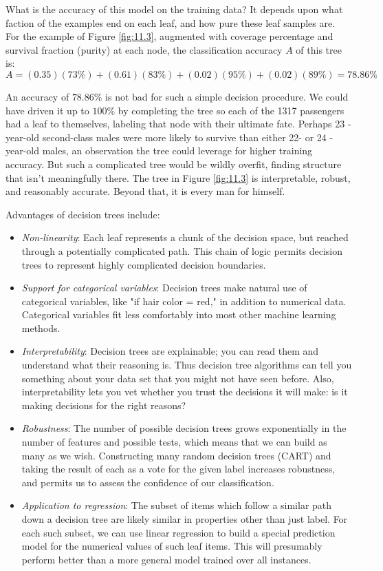\documentclass[10pt]{article}
\begin{document}
\begin{enumerate}
What is the accuracy of this model on the training data? It depends upon what faction of the examples end on each leaf, and how pure these leaf samples are. For the example of Figure \ref{fig:11.3}, augmented with coverage percentage and survival fraction (purity) at each node, the classification accuracy $A$ of this tree is:
\[
A = (0.35)(73\%) + (0.61)(83\%) + (0.02)(95\%) + (0.02)(89\%) = 78.86\%
\]

An accuracy of $78.86\%$ is not bad for such a simple decision procedure. We could have driven it up to $100\%$ by completing the tree so each of the 1317 passengers had a leaf to themselves, labeling that node with their ultimate fate. Perhaps 23 -year-old second-class males were more likely to survive than either 22- or 24 -year-old males, an observation the tree could leverage for higher training accuracy. But such a complicated tree would be wildly overfit, finding structure that isn't meaningfully there. The tree in Figure \ref{fig:11.3} is interpretable, robust, and reasonably accurate. Beyond that, it is every man for himself.

Advantages of decision trees include:

\begin{itemize}
  \item \textit{Non-linearity}: Each leaf represents a chunk of the decision space, but reached through a potentially complicated path. This chain of logic permits decision trees to represent highly complicated decision boundaries.
  \item \textit{Support for categorical variables}: Decision trees make natural use of categorical variables, like "if hair color = red," in addition to numerical data. Categorical variables fit less comfortably into most other machine learning methods.
  \item \textit{Interpretability}: Decision trees are explainable; you can read them and understand what their reasoning is. Thus decision tree algorithms can tell you something about your data set that you might not have seen before. Also, interpretability lets you vet whether you trust the decisions it will make: is it making decisions for the right reasons?
  \item \textit{Robustness}: The number of possible decision trees grows exponentially in the number of features and possible tests, which means that we can build as many as we wish. Constructing many random decision trees (CART) and taking the result of each as a vote for the given label increases robustness, and permits us to assess the confidence of our classification.
  \item \textit{Application to regression}: The subset of items which follow a similar path down a decision tree are likely similar in properties other than just label. For each such subset, we can use linear regression to build a special prediction model for the numerical values of such leaf items. This will presumably perform better than a more general model trained over all instances.
\end{itemize}


\end{enumerate}
\end{document}

